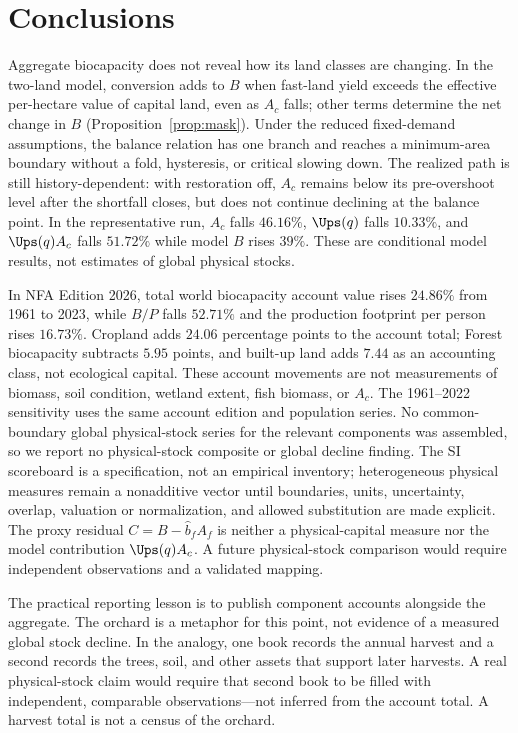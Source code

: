 \section{Conclusions}\label{sec:conclusions}

Aggregate biocapacity does not reveal how its land classes are changing. In the two-land model, conversion adds to $B$ when fast-land yield exceeds the effective per-hectare value of capital land, even as $A_c$ falls; other terms determine the net change in $B$ (Proposition~\ref{prop:mask}). Under the reduced fixed-demand assumptions, the balance relation has one branch and reaches a minimum-area boundary without a fold, hysteresis, or critical slowing down. The realized path is still history-dependent: with restoration off, $A_c$ remains below its pre-overshoot level after the shortfall closes, but does not continue declining at the balance point. In the representative run, $A_c$ falls $46.16\%$, $\Ups(q)$ falls $10.33\%$, and $\Ups(q)A_c$ falls $51.72\%$ while model $B$ rises $39\%$. These are conditional model results, not estimates of global physical stocks.

In NFA Edition 2026, total world biocapacity account value rises $24.86\%$ from 1961 to 2023, while $B/P$ falls $52.71\%$ and the production footprint per person rises $16.73\%$. Cropland adds $24.06$ percentage points to the account total; Forest biocapacity subtracts $5.95$ points, and built-up land adds $7.44$ as an accounting class, not ecological capital. These account movements are not measurements of biomass, soil condition, wetland extent, fish biomass, or $A_c$. The 1961--2022 sensitivity uses the same account edition and population series. No common-boundary global physical-stock series for the relevant components was assembled, so we report no physical-stock composite or global decline finding. The SI scoreboard is a specification, not an empirical inventory; heterogeneous physical measures remain a nonadditive vector until boundaries, units, uncertainty, overlap, valuation or normalization, and allowed substitution are made explicit. The proxy residual $C=B-\hat b_fA_f$ is neither a physical-capital measure nor the model contribution $\Ups(q)A_c$. A future physical-stock comparison would require independent observations and a validated mapping.

The practical reporting lesson is to publish component accounts alongside the aggregate. The orchard is a metaphor for this point, not evidence of a measured global stock decline. In the analogy, one book records the annual harvest and a second records the trees, soil, and other assets that support later harvests. A real physical-stock claim would require that second book to be filled with independent, comparable observations—not inferred from the account total. A harvest total is not a census of the orchard.

